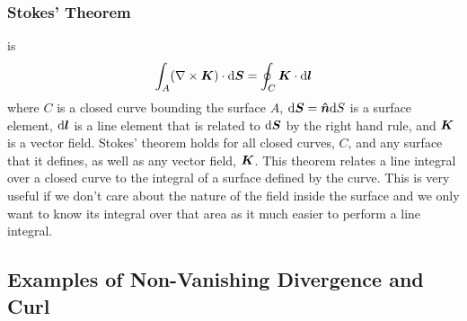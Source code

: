     \subsubsection{Stokes' Theorem}
     is
    \[\int_A (\nabla\times\bm{K})\cdot\dd\bm{S} = \oint_C\bm{K}\cdot\dd\bm{l}\]
    where \(C\) is a closed curve bounding the surface \(A\), \(\dd\bm{S} = \bm{\hat{n}}\dd S\) is a surface element, \(\dd\bm{l}\) is a line element that is related to \(\dd\bm{S}\) by the right hand rule, and \(\bm{K}\) is a vector field.
    Stokes' theorem holds for all closed curves, \(C\), and any surface that it defines, as well as any vector field, \(\bm{K}\).
    This theorem relates a line integral over a closed curve to the integral of a surface defined by the curve.
    This is very useful if we don't care about the nature of the field inside the surface and we only want to know its integral over that area as it much easier to perform a line integral.
    
    \subsection{Examples of Non-Vanishing Divergence and Curl}
